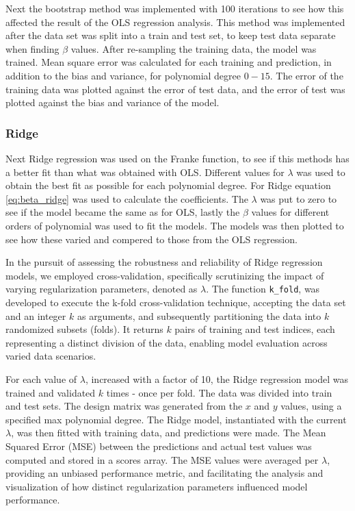 \noindent Next the bootstrap method was implemented with 100 iterations to see how this 
affected the result of the OLS regression analysis. This method was implemented after the data set was split into a train and test set, to keep test data separate when finding $\beta$ values. After re-sampling the training data, the model was trained. Mean square error was calculated for each training and prediction, in addition to the bias and variance, for polynomial degree $0-15$. The error of the training data was plotted against the error of test data, and the error of test was plotted against the bias and variance of the model. 

\subsubsection{Ridge}
\noindent Next Ridge regression was used on the Franke function,
to see if this methods has a better fit than what was obtained with OLS.
Different values for $\lambda$ was used to obtain the best fit as possible for each polynomial degree. For Ridge equation \eqref{eq:beta_ridge} was used to calculate the coefficients. The $\lambda$ was put to zero to see if the model became the same as for OLS, lastly the $\beta$ values for different orders of polynomial was used to fit the models. The models was then plotted to see how these varied and compered to those from the OLS regression.

\noindent In the pursuit of assessing the robustness and reliability of Ridge regression models, we employed cross-validation, specifically scrutinizing the impact of varying regularization parameters, denoted as \(\lambda\). The function \texttt{k\_fold}, was developed to execute the k-fold cross-validation technique, accepting the data set and an integer \(k\) as arguments, and subsequently partitioning the data into \(k\) randomized subsets (folds). It returns \(k\) pairs of training and test indices, each representing a distinct division of the data, enabling model evaluation across varied data scenarios. 

\noindent For each value of \(\lambda\), increased with a factor of 10, the Ridge regression model was trained and validated \(k\) times - once per fold. The data was divided into train and test sets. The design matrix was generated from the \(x\) and \(y\) values, using a specified max polynomial degree. The Ridge model, instantiated with the current \(\lambda\), was then fitted with training data, and predictions were made. The Mean Squared Error (MSE) between the predictions and actual test values was computed and stored in a scores array. The MSE values were averaged per \(\lambda\), providing an unbiased performance metric, and facilitating the analysis and visualization of how distinct regularization parameters influenced model performance. 

